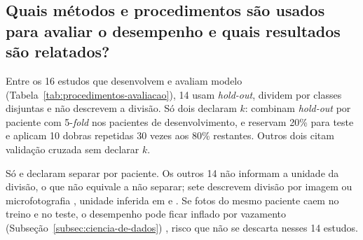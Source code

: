 \subsection{Quais métodos e procedimentos são usados para avaliar o desempenho e quais resultados são relatados?}
\label{subsec:rq3-metodos}

Entre os 16 estudos que desenvolvem e avaliam modelo
(Tabela~\ref{tab:procedimentos-avaliacao}),
14 usam \textit{hold-out},  dividem por classes
disjuntas e  não descrevem a divisão. Só dois declaram $k$:
 combinam \textit{hold-out} por paciente com
5-\textit{fold} nos pacientes de desenvolvimento, e
 reservam 20\% para teste e aplicam 10 dobras
repetidas 30 vezes aos 80\% restantes. Outros dois citam validação cruzada
sem declarar $k$.

Só  e  declaram separar por
paciente. Os outros 14 não
informam a unidade da divisão, o que não equivale a não separar; sete
descrevem divisão por imagem ou microfotografia
\cite{vargasclavijo2025,baweja2023,pons2026,gawali2024,eita2025,jaikishore2021,banerjee2023},
unidade inferida em  e . Se
fotos do mesmo paciente caem no treino e no teste, o desempenho pode ficar
inflado por vazamento (Subseção~\ref{subsec:ciencia-de-dados})
\cite{kapoor2023}, risco que não se descarta nesses 14 estudos.

